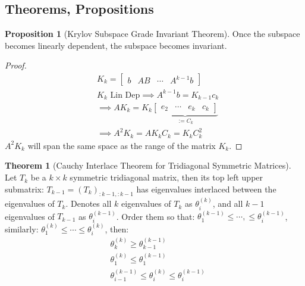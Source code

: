 \documentclass[]{article}
\theoremstyle{definition}
\newtheorem{theorem}{Theorem}            %
\newtheorem{prop}{Proposition}[section]  %
\begin{document}
\begin{appendices}
    \section{Theorems, Propositions}
        \begin{prop}[Krylov Subspace Grade Invariant Theorem]\label{prop:Krylov_Subspace_Grade_Invariant_Theorem}
            Once the subspace becomes linearly dependent, the subspace becomes invariant. 
        \end{prop}
        \begin{proof}
            \begin{align}
                & K_k = \begin{bmatrix}
                    b & AB & \cdots & A^{k - 1}b
                \end{bmatrix}
                \\
                & K_k \text{ Lin Dep} \implies A^{k-1}b = K_{k - 1}c_k
                \\
                & \implies 
                AK_k = K_k
                    \underbrace{\begin{bmatrix}
                        e_2 & \cdots & e_k & c_k
                    \end{bmatrix}}_{:= C_k}
                \\
                & \implies 
                A^2K_k = AK_kC_k = K_kC_k^2
            \end{align}
            $A^2K_k$ will span the same space as the range of the matrix $K_k$.
        \end{proof}
        \begin{theorem}[Cauchy Interlace Theorem for Tridiagonal Symmetric Matrices]\label{theorem:cauchy_interlace}
            Let $T_k$ be a $k\times k$ symmetric tridiagonal matrix, then its top left upper submatrix: $T_{k-1}=(T_k)_{:k - 1, :k -1}$ has eigenvalues interlaced between the eigenvalues of $T_k$. Denotes all $k$ eigenvalues of $T_k$ as $\theta_i^{(k)}$, and all $k - 1$ eigenvalues of $T_{k - 1}$ as $\theta_i^{(k - 1)}$. Order them so that: $\theta_1^{(k - 1)} \le \cdots, \le \theta_i^{(k - 1)}$, similarly: $\theta_1^{(k)}\le \cdots \le \theta_i^{(k)}$, then: 
            \begin{align}
                & \theta_{k}^{(k)} \ge \theta_{k - 1}^{(k - 1)}
                \\
                & \theta_{1}^{(k)} \le \theta_{1}^{(k - 1)}
                \\
                & \theta_{i -1}^{(k - 1)} \le \theta_{i}^{(k)} \le \theta_{i}^{(k - 1)}

\end{align}
\end{theorem}
\end{appendices}
\end{document}
